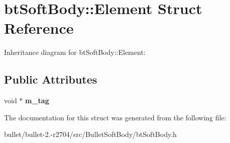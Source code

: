 \hypertarget{structbt_soft_body_1_1_element}{\section{bt\+Soft\+Body\+:\+:Element Struct Reference}
\label{structbt_soft_body_1_1_element}
}


Inheritance diagram for bt\+Soft\+Body\+:\+:Element\+:
\subsection*{Public Attributes}
\begin{DoxyCompactItemize}
\item 
\hypertarget{structbt_soft_body_1_1_element_a1291adac8206f851b096f6bd913cae13}{void $\ast$ {\bfseries m\+\_\+tag}}\label{structbt_soft_body_1_1_element_a1291adac8206f851b096f6bd913cae13}

\end{DoxyCompactItemize}


The documentation for this struct was generated from the following file\+:\begin{DoxyCompactItemize}
\item 
bullet/bullet-\/2.-\/r2704/src/\+Bullet\+Soft\+Body/bt\+Soft\+Body.\+h\end{DoxyCompactItemize}
